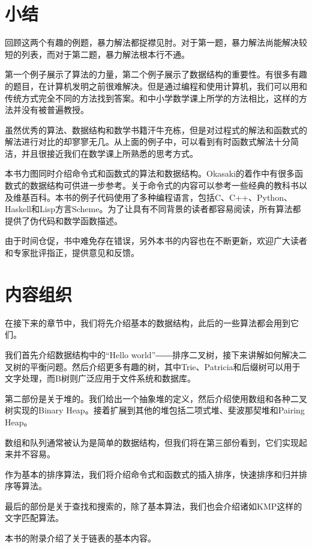 \documentclass[UTF8]{article}
\begin{document}
\section{小结}
回顾这两个有趣的例题，暴力解法都捉襟见肘。对于第一题，暴力解法尚能解决较短的列表，而对于第二题，暴力解法根本行不通。

第一个例子展示了算法的力量，第二个例子展示了数据结构的重要性。有很多有趣的题目，在计算机发明之前很难解决。但是通过编程和使用计算机，我们可以用和传统方式完全不同的方法找到答案。和中小学数学课上所学的方法相比，这样的方法并没有被普遍教授。

虽然优秀的算法、数据结构和数学书籍汗牛充栋，但是对过程式的解法和函数式的解法进行对比的却寥寥无几。从上面的例子中，可以看到有时函数式解法十分简洁，并且很接近我们在数学课上所熟悉的思考方式。

本书力图同时介绍命令式和函数式的算法和数据结构。Okasaki的着作\cite{okasaki-book}中有很多函数式的数据结构可供进一步参考。关于命令式的内容可以参考一些经典的教科书\cite{CLRS}以及维基百科。本书的例子代码使用了多种编程语言，包括C、C++、Python、Haskell和Lisp方言Scheme。为了让具有不同背景的读者都容易阅读，所有算法都提供了伪代码和数学函数描述。

由于时间仓促，书中难免存在错误，另外本书的内容也在不断更新，欢迎广大读者和专家批评指正，提供意见和反馈。

\section{内容组织}
在接下来的章节中，我们将先介绍基本的数据结构，此后的一些算法都会用到它们。

我们首先介绍数据结构中的“Hello world”――排序二叉树，接下来讲解如何解决二叉树的平衡问题。然后介绍更多有趣的树，其中Trie、Patricia和后缀树可以用于文字处理，而B树则广泛应用于文件系统和数据库。

第二部份是关于堆的。我们给出一个抽象堆的定义，然后介绍使用数组和各种二叉树实现的Binary Heap。接着扩展到其他的堆包括二项式堆、斐波那契堆和Pairing Heap。

数组和队列通常被认为是简单的数据结构，但我们将在第三部份看到，它们实现起来并不容易。

作为基本的排序算法，我们将介绍命令式和函数式的插入排序，快速排序和归并排序等算法。

最后的部份是关于查找和搜索的，除了基本算法，我们也会介绍诸如KMP这样的文字匹配算法。

本书的附录介绍了关于链表的基本内容。
\end{document}
